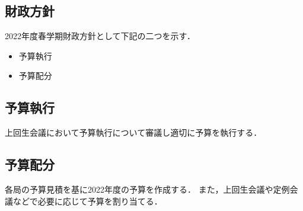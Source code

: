 \subsection*{財政方針}


2022年度春学期財政方針として下記の二つを示す．
\begin{itemize}
    \item 予算執行
    \item 予算配分
\end{itemize}

\subsection*{予算執行}
上回生会議において予算執行について審議し適切に予算を執行する．

\subsection*{予算配分}
各局の予算見積を基に2022年度の予算を作成する．
また，上回生会議や定例会議などで必要に応じて予算を割り当てる．
